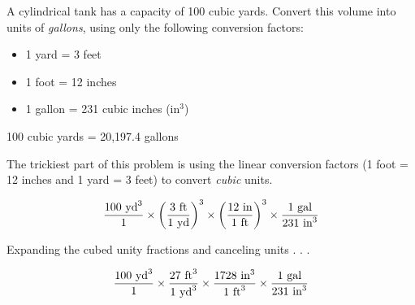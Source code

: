 

A cylindrical tank has a capacity of 100 cubic yards.  Convert this volume into units of {\it gallons}, using only the following conversion factors:

\begin{itemize}
\item{} 1 yard = 3 feet
\item{} 1 foot = 12 inches
\item{} 1 gallon = 231 cubic inches (in$^{3}$)
\end{itemize}







100 cubic yards = 20,197.4 gallons

\vskip 10pt

The trickiest part of this problem is using the linear conversion factors (1 foot = 12 inches and 1 yard = 3 feet) to convert {\it cubic} units.

$${100 \hbox{ yd}^3 \over 1} \times \left({3 \hbox{ ft} \over 1 \hbox{ yd}}\right)^3 \times \left({12 \hbox{ in} \over 1 \hbox{ ft}}\right)^3 \times {1 \hbox{ gal} \over 231 \hbox{ in}^3}$$

Expanding the cubed unity fractions and canceling units . . .

$${100 \hbox{ yd}^3 \over 1} \times {27 \hbox{ ft}^3 \over 1 \hbox{ yd}^3} \times {1728 \hbox{ in}^3 \over 1 \hbox{ ft}^3} \times {1 \hbox{ gal} \over 231 \hbox{ in}^3}$$











